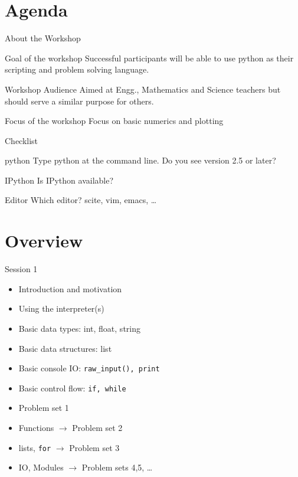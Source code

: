 \documentclass[14pt,compress]{beamer}
\begin{document}
\section{Agenda}
\begin{frame}{About the Workshop}
  \begin{block}{Goal of the workshop}
	Successful participants will be able to use python as their scripting and problem solving language. 
  \end{block}
  \begin{block}{Workshop Audience}
        Aimed at Engg., Mathematics and Science teachers  but should serve a similar purpose for others. 
  \end{block}
  \begin{block}{Focus of the workshop}
        Focus on basic numerics and plotting
  \end{block}
\end{frame}

\begin{frame}{Checklist}
	\begin{block}{python}
          Type python at the command line. Do you see version 2.5 or later?
        \end{block}
        \begin{block}{IPython}
          Is IPython available?
        \end{block}
        \begin{block}{Editor}
          Which editor? scite, vim, emacs, \ldots
        \end{block}
\end{frame}

\section{Overview}
\begin{frame}{Session 1}
  \begin{itemize}
	\item Introduction and motivation
	\item Using the interpreter(s)
	\item Basic data types: int, float, string
	\item Basic data structures: list
	\item Basic console IO: \texttt{raw\_input(), print}
    \item Basic control flow: \texttt{if, while}
	\item Problem set 1
    \item Functions $\rightarrow$ Problem set 2
    \item lists, \texttt{for}  $\rightarrow$ Problem set 3
    \item IO, Modules $\rightarrow$ Problem sets 4,5, \ldots
  \end{itemize}
\end{frame}
\end{document}
